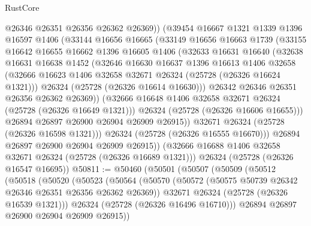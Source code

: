 \begin{lexlean}{RustCore}
\begin{coremodule}
              @26346
              @26351
              @26356
              @26362
              @26369))
          (@39454
            @16667
            @1321
            @1339
            @1396
            @16597
            @1406
            (@33144
              @16656
              @16665
              (@33149
                @16656
                @16663
                @1739
                (@33155
                  @16642
                  @16655
                  @16662
                  @1396
                  @16605
                  @1406
                  (@32633
                    @16631
                    @16640
                    (@32638
                      @16631
                      @16638
                      @1452
                      (@32646
                        @16630
                        @16637
                        @1396
                        @16613
                        @1406
                        @32658
                        (@32666 @16623 @1406 @32658 @32671 @26324 (@25728 (@26326 @16624 @1321)))
                        @26324
                        (@25728 (@26326 @16614 @16630)))
                      @26342
                      @26346
                      @26351
                      @26356
                      @26362
                      @26369))
                  (@32666 @16648 @1406 @32658 @32671 @26324 (@25728 (@26326 @16649 @1321)))
                  @26324
                  (@25728 (@26326 @16606 @16655)))
                @26894
                @26897
                @26900
                @26904
                @26909
                @26915))
            @32671
            @26324
            (@25728 (@26326 @16598 @1321)))
          @26324
          (@25728 (@26326 @16555 @16670)))
        @26894
        @26897
        @26900
        @26904
        @26909
        @26915))
    (@32666 @16688 @1406 @32658 @32671 @26324 (@25728 (@26326 @16689 @1321)))
    @26324
    (@25728 (@26326 @16547 @16695))
@50811 := @50460
    (@50501
      (@50507
        (@50509
          (@50512
            (@50518
              (@50520
                (@50523
                  (@50564
                    (@50570
                      (@50572 (@50575 @50739 @26342 @26346 @26351 @26356 @26362 @26369))
                      @32671
                      @26324
                      (@25728 (@26326 @16539 @1321)))
                    @26324
                    (@25728 (@26326 @16496 @16710)))
                  @26894
                  @26897
                  @26900
                  @26904
                  @26909
                  @26915))

\end{coremodule}
\end{lexlean}
